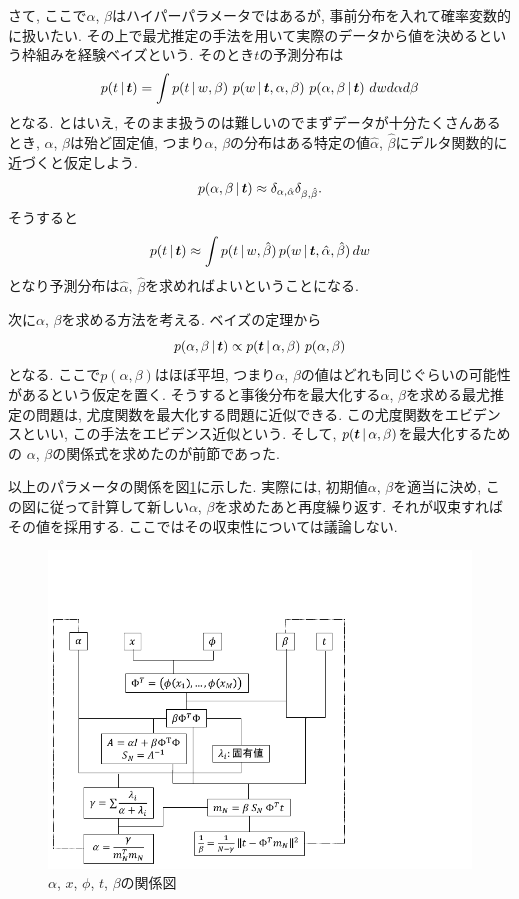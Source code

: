 さて, ここで$\alpha$, $\beta$はハイパーパラメータではあるが, 事前分布を入れて確率変数的に扱いたい.
その上で最尤推定の手法を用いて実際のデータから値を決めるという枠組みを経験ベイズという.
そのとき$t$の予測分布は
$$
\fnvPair p(t|\bm{t})
= \int \fnvPair p(t|w,\beta)\,
       \fnvPair p(w|\bm{t},\alpha,\beta)\,
       \fnvPair p(\alpha,\beta|\bm{t})\,
       dw d\alpha d\beta
$$
となる. とはいえ, そのまま扱うのは難しいのでまずデータが十分たくさんあるとき, $\alpha$, $\beta$は殆ど固定値,
つまり$\alpha$, $\beta$の分布はある特定の値$\hat{\alpha}$, $\hat{\beta}$にデルタ関数的に近づくと仮定しよう.
$$
\fnvPair p(\alpha,\beta|\bm{t})
\approx \delta_{\alpha,\hat{\alpha}} \delta_{\beta,\hat{\beta}}.
$$
そうすると
$$
\fnvPair p(t|\bm{t})
\approx \int \fnvpair p(t|w,\hat{\beta})\,
             \fnvpair p(w|\bm{t},\hat{\alpha},\hat{\beta})\,
             dw
$$
となり予測分布は$\hat{\alpha}$, $\hat{\beta}$を求めればよいということになる.

次に$\alpha$, $\beta$を求める方法を考える. ベイズの定理から
$$
\fnvPair p(\alpha,\beta|\bm{t})
\propto \fnvPair p(\bm{t}|\alpha,\beta)\,
        p(\alpha,\beta)
$$
となる. ここで$p(\alpha,\beta)$はほぼ平坦, つまり$\alpha$, $\beta$の値はどれも同じぐらいの可能性があるという仮定を置く.
そうすると事後分布を最大化する$\alpha$, $\beta$を求める最尤推定の問題は, 尤度関数を最大化する問題に近似できる.
この尤度関数をエビデンスといい, この手法をエビデンス近似という.
そして, $\fnvPair p(\bm{t}|\alpha,\beta)$を最大化するための
$\alpha$, $\beta$の関係式を求めたのが前節であった.

以上のパラメータの関係を図\ref{para-dep}に示した.
実際には, 初期値$\alpha$, $\beta$を適当に決め, この図に従って計算して新しい$\alpha$, $\beta$を求めたあと再度繰り返す.
それが収束すればその値を採用する. ここではその収束性については議論しない.
\begin{figure}[ht]
 \begin{minipage}{1\hsize}
  \centering
  \includegraphics*[bb=0 0 260 220]{./para-dep.pdf}
  \caption{$\alpha$, $x$, $\phi$, $t$, $\beta$の関係図}
  \label{para-dep}
 \end{minipage}
\end{figure}
